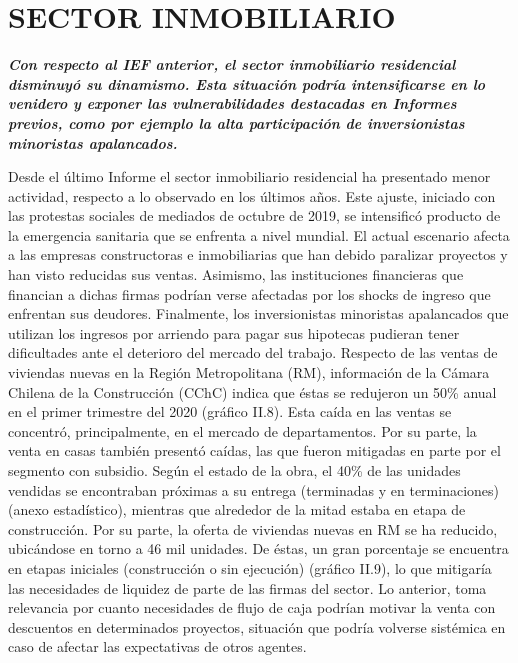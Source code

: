 \documentclass[
]{book}
\begin{document}
\hypertarget{SIN}{%
\section*{SECTOR INMOBILIARIO}\label{SIN}}

\textbf{\emph{Con respecto al IEF anterior, el sector inmobiliario residencial
disminuyó su dinamismo. Esta situación podría intensificarse en lo
venidero y exponer las vulnerabilidades destacadas en Informes
previos, como por ejemplo la alta participación de inversionistas
minoristas apalancados.}}

Desde el último Informe el sector inmobiliario residencial ha presentado menor
actividad, respecto a lo observado en los últimos años. Este ajuste, iniciado
con las protestas sociales de mediados de octubre de 2019, se intensificó
producto de la emergencia sanitaria que se enfrenta a nivel mundial. El actual
escenario afecta a las empresas constructoras e inmobiliarias que han debido
paralizar proyectos y han visto reducidas sus ventas. Asimismo, las instituciones
financieras que financian a dichas firmas podrían verse afectadas por los
shocks de ingreso que enfrentan sus deudores. Finalmente, los inversionistas
minoristas apalancados que utilizan los ingresos por arriendo para pagar sus
hipotecas pudieran tener dificultades ante el deterioro del mercado del trabajo.
Respecto de las ventas de viviendas nuevas en la Región Metropolitana (RM),
información de la Cámara Chilena de la Construcción (CChC) indica que
éstas se redujeron un 50\% anual en el primer trimestre del 2020 (gráfico
II.8). Esta caída en las ventas se concentró, principalmente, en el mercado de
departamentos. Por su parte, la venta en casas también presentó caídas, las que
fueron mitigadas en parte por el segmento con subsidio. Según el estado de la
obra, el 40\% de las unidades vendidas se encontraban próximas a su entrega
(terminadas y en terminaciones) (anexo estadístico), mientras que alrededor de
la mitad estaba en etapa de construcción. Por su parte, la oferta de viviendas
nuevas en RM se ha reducido, ubicándose en torno a 46 mil unidades. De
éstas, un gran porcentaje se encuentra en etapas iniciales (construcción o sin
ejecución) (gráfico II.9), lo que mitigaría las necesidades de liquidez de parte
de las firmas del sector. Lo anterior, toma relevancia por cuanto necesidades
de flujo de caja podrían motivar la venta con descuentos en determinados
proyectos, situación que podría volverse sistémica en caso de afectar las
expectativas de otros agentes.
\end{document}
